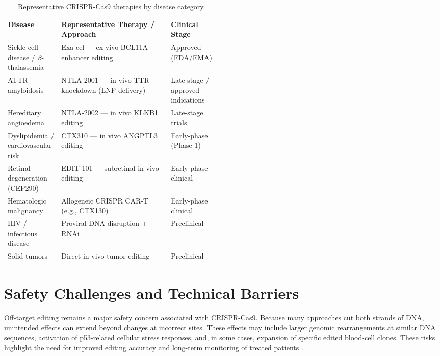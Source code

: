 \documentclass[11pt,a4paper]{article}
\newcommand{\tablefont}{\small}
\begin{document}
\begin{table}[!htbp]
\centering
\tablefont
\caption{Representative CRISPR-Cas9 therapies by disease category.}
\label{tab:crispr-therapies}
\begin{tabularx}{\linewidth}{|>{\raggedright\arraybackslash}p{0.25\linewidth}|X|>{\raggedright\arraybackslash}p{0.24\linewidth}|}
\hline
\textbf{Disease} & \textbf{Representative Therapy / Approach} & \textbf{Clinical Stage} \\
\hline
Sickle cell disease / $\beta$-thalassemia & Exa-cel --- ex vivo BCL11A enhancer editing & Approved (FDA/EMA) \\
\hline
ATTR amyloidosis & NTLA-2001 --- in vivo TTR knockdown (LNP delivery) & Late-stage / approved indications \\
\hline
Hereditary angioedema & NTLA-2002 --- in vivo KLKB1 editing & Late-stage trials \\
\hline
Dyslipidemia / cardiovascular risk & CTX310 --- in vivo ANGPTL3 editing & Early-phase (Phase 1) \\
\hline
Retinal degeneration (CEP290) & EDIT-101 --- subretinal in vivo editing & Early-phase clinical \\
\hline
Hematologic malignancy & Allogeneic CRISPR CAR-T (e.g., CTX130) & Early-phase clinical \\
\hline
HIV / infectious disease & Proviral DNA disruption + RNAi & Preclinical \\
\hline
Solid tumors & Direct in vivo tumor editing & Preclinical \\
\hline
\end{tabularx}
\end{table}

\section{Safety Challenges and Technical Barriers}\label{safety-challenges-and-technical-barriers}

Off-target editing remains a major safety concern associated with CRISPR-Cas9. Because many approaches cut both strands of DNA, unintended effects can extend beyond changes at incorrect sites. These effects may include larger genomic rearrangements at similar DNA sequences, activation of p53-related cellular stress responses, and, in some cases, expansion of specific edited blood-cell clones. These risks highlight the need for improved editing accuracy and long-term monitoring of treated patients \cite{kalter2025}.
\end{document}
